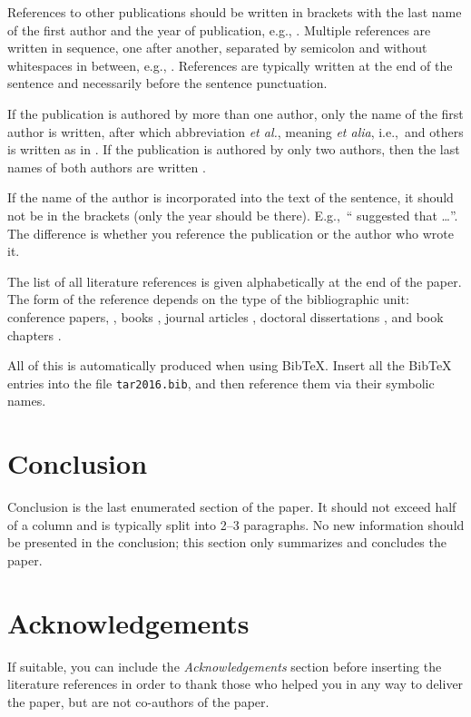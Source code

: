 \documentclass[10pt, a4paper]{article}
\begin{document}
References to other publications should be written in brackets with the last name of the first author and the year of publication, e.g., \citep{chomsky-73}.  Multiple references are written in sequence, one after another, separated by semicolon and without whitespaces in between, e.g., \citep{chomsky-73,chave-64,feigl-58}. References are typically written at the end of the sentence and necessarily before the sentence punctuation.

If the publication is authored by more than one author, only the name of the first author is written, after which abbreviation \emph{et al.}, meaning \emph{et alia}, i.e.,~and others is written as in \citep{johnson-etc}. If the publication is authored by only two authors, then the last names of both authors are written \citep{johnson-howells}.

If the name of the author is incorporated into the text of the sentence, it should not be in the brackets (only the year should be there). E.g.,~``\citet{chomsky-73}
suggested that \dots''. The difference is whether you reference the publication or the author who wrote it.

The list of all literature references is given alphabetically at the end of the paper. The form of the reference depends on the type of the bibliographic unit: conference papers,
\citep{chave-64}, books \citep{butcher-81}, journal articles
\citep{howells-51}, doctoral dissertations \citep{croft-78}, and book chapters \citep{feigl-58}.

All of this is automatically produced when using BibTeX. Insert all the BibTeX entries into the file \texttt{tar2016.bib}, and then reference them via their symbolic names.

\section{Conclusion}

Conclusion is the last enumerated section of the paper. It should not exceed half of a column and is typically split into 2--3 paragraphs. No new information should be presented in the conclusion; this section only summarizes and concludes the paper.

\section*{Acknowledgements}

If suitable, you can include the \textit{Acknowledgements} section before inserting the literature references  in order to thank those who helped you in any way to deliver the paper, but are not co-authors of the paper.



\nocite{*}
\end{document}
